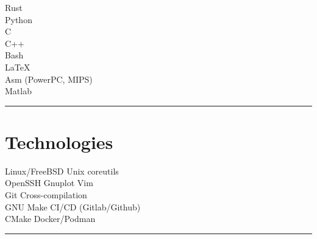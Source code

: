 \documentclass[letterpaper]{deedy-resume}
\begin{document}
\begin{minipage}[t]{0.25\textwidth}
\textbullet{} Rust\\
\textbullet{} Python \\
\textbullet{} C \\
\textbullet{} C++ \\
\textbullet{} Bash \\
\textbullet{} \LaTeX \\
\textbullet{} Asm (PowerPC, MIPS) \\
\textbullet{} Matlab \\

\sectionspace %
\vspace{-1ex}
\rule{5cm}{0.5pt}
\vspace{2em}

\section{Technologies}

\vspace{1em}

Linux/FreeBSD \textbullet{} Unix coreutils\\
OpenSSH \textbullet{} Gnuplot \textbullet{} Vim\\
Git \textbullet{} Cross-compilation\\
GNU Make \textbullet{} CI/CD (Gitlab/Github)\\
CMake \textbullet{} Docker/Podman
\sectionspace
\vspace{-1.5ex}
\rule{5cm}{0.5pt}
\vspace{2em}






\end{minipage}
\end{document}
